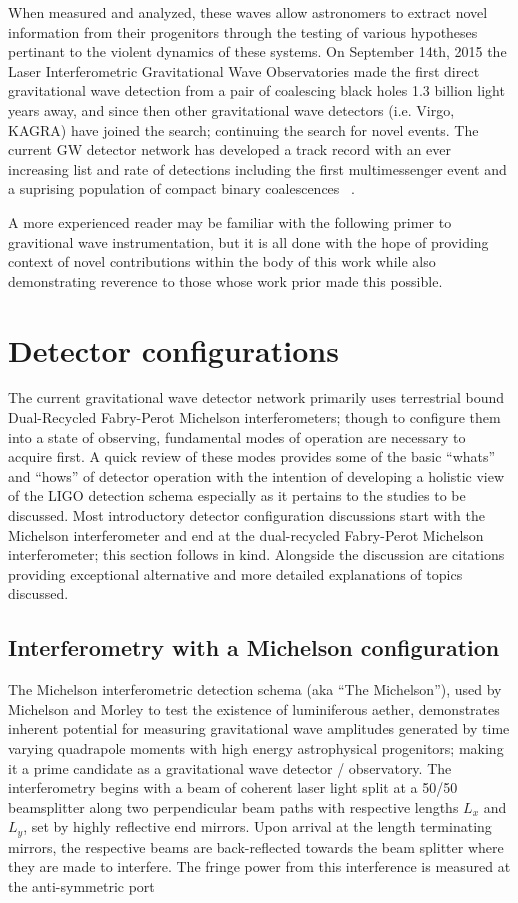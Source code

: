 When measured and analyzed, these waves allow astronomers to extract novel information from their progenitors through the testing of various hypotheses pertinant to the violent dynamics of these systems. On September 14th, 2015 the Laser Interferometric Gravitational Wave Observatories made the first direct gravitational wave detection from a pair of coalescing black holes 1.3 billion light years away, and since then other gravitational wave detectors (i.e. Virgo, KAGRA) have joined the search; continuing the search for novel events. The current GW detector network has developed a track record with an ever increasing list and rate of detections including the first multimessenger event and a suprising population of compact binary coalescences ~\cite{gw170817, nitz:2023}. 

A more experienced reader may be familiar with the following primer to gravitional wave instrumentation, but it is all done with the hope of providing context of novel contributions within the body of this work while also demonstrating reverence to those whose work prior made this possible. 
\section{Detector configurations}\label{sec:detcon}
The current gravitational wave detector network primarily uses terrestrial bound Dual-Recycled Fabry-Perot Michelson interferometers; though to configure them into a state of observing, fundamental modes of operation are necessary to acquire first. A quick review of these modes provides some of the basic ``whats'' and ``hows'' of detector operation with the intention of developing a holistic view of the LIGO detection schema especially as it pertains to the studies to be discussed. Most introductory detector configuration discussions start with the Michelson interferometer and end at the dual-recycled Fabry-Perot Michelson interferometer; this section follows in kind. Alongside the discussion are citations providing exceptional alternative and more detailed explanations of topics discussed.

\subsection{Interferometry with a Michelson configuration}
The Michelson interferometric detection schema (aka ``The Michelson''), used by Michelson and Morley to test the existence of luminiferous aether, demonstrates inherent potential for measuring gravitational wave amplitudes generated by time varying quadrapole moments with high energy astrophysical progenitors; making it a prime candidate as a gravitational wave detector / observatory. The interferometry begins with a beam of coherent laser light split at a 50/50 beamsplitter along two perpendicular beam paths with respective lengths $L_x$ and $L_y$, set by highly reflective end mirrors. Upon arrival at the length terminating mirrors, the respective beams are back-reflected towards the beam splitter where they are made to interfere. The fringe power from this interference is measured at the anti-symmetric port 


